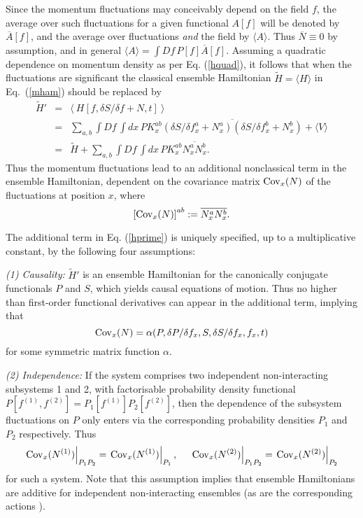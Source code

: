 \documentclass[a4paper,preprint, showpacs, aps, draft]{revtex4}
\begin{document}
{Since the momentum fluctuations may conceivably depend on the field $f$,
the average over such fluctuations for a given functional $A[f]$ will be
denoted by $\overline{A}[f]$, and the average over fluctuations {\it
and} the field by $\langle A\rangle$.  Thus $\overline{N}\equiv 0$ 
by assumption, and in general $\langle A\rangle = \int
D\!f\,P[f] \overline{A}[f]$.  Assuming a quadratic dependence on
momentum density as per Eq. (\ref{hquad}), it follows 
that when the fluctuations are
significant the classical 
ensemble Hamiltonian $\tilde{H} = \langle H\rangle$ in Eq.~(\ref{mham}) should
be replaced by
\begin{eqnarray}
\tilde{H}' & = & \langle~ H[f, \delta S/\delta f + N, t]~\rangle\nonumber\\\
& = & \sum_{a,b}\int D\!f\,\int dx\, P K^{ab}_x \overline{( \delta
S/\delta f^a_x +N^a_x) (\delta S/\delta f^b_x +N^b_x)} + \langle
V\rangle\nonumber\\ \label{hprime}
& = & \tilde{H} + \sum_{a,b}\int D\!f\, \int dx\, P K^{ab}_x \overline{
N^a_xN^b_x} .  
\end{eqnarray}
Thus the momentum fluctuations lead to an additional nonclassical term in the 
ensemble Hamiltonian, dependent on the covariance matrix ${\rm
Cov}_x(N)$ of the fluctuations at position $x$, where
\begin{equation} \label{covn}
\left[{\rm Cov}_x(N)\right]^{ab} := \overline{N^a_xN^b_x} .  
\end{equation}

The additional term in Eq. (\ref{hprime}) is uniquely specified, up to a
multiplicative constant, by the following four assumptions:

{\it (1) Causality:}  $\tilde{H}'$ is an ensemble Hamiltonian for the
canonically conjugate functionals $P$ and $S$, which yields causal equations
of motion. Thus no higher than first-order functional derivatives can appear in
the additional term, implying that 
\[
{\rm Cov}_x(N) = \alpha(P, \delta P/\delta f_x, S, \delta S/\delta
f_x, f_x, t) 
\]
for some symmetric matrix function $\alpha$.

{\it (2) Independence:}  If the system comprises two independent
non-interacting subsystems 1 and 2, with factorisable probability
density functional $P[f^{(1)},f^{(2)}] = P_1[f^{(1)}] P_2[f^{(2)}]$, 
then the dependence of the subsystem fluctuations on $P$ only enters via
the corresponding probability densities $P_1$ and $P_2$ respectively. Thus
\[
\left.{\rm Cov}_x(N^{(1)})\right|_{P_1P_2} = \left.{\rm
Cov}_x(N^{(1)})\right|_{P_1}, ~~~~\left.{\rm
Cov}_x(N^{(2)})\right|_{P_1P_2} =\left.{\rm Cov}_x(N^{(2)})\right|_{P_2}
\]
for such a system.  
Note that this assumption implies that ensemble Hamiltonians are 
additive for independent non-interacting ensembles (as are the
corresponding actions \cite{footact}). 

}
\end{document}

